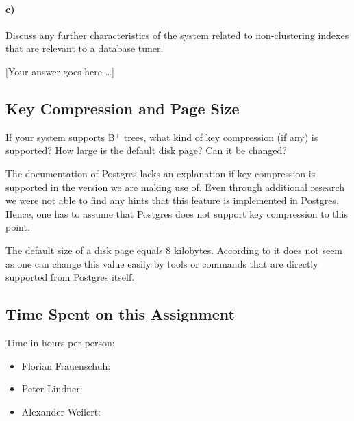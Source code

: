 \documentclass[11pt]{scrartcl}
\newcommand{\youranswerhere}{[Your answer goes here \ldots]}
\begin{document}
\paragraph{c)}

Discuss any further characteristics of the system related to non-clustering indexes that are relevant to a database tuner.

\youranswerhere{}

\subsection{Key Compression and Page Size}

If your system supports B$^+$ trees, what kind of key compression (if any) is supported?
How large is the default disk page?
Can it be changed?

The documentation of Postgres lacks an explanation if key compression is supported in the version we are making use of.
Even through additional research we were not able to find any hints that this feature is implemented in Postgres.
Hence, one has to assume that Postgres does not support key compression to this point.

The default size of a disk page equals 8 kilobytes.
According to \cite{PostgreSQL2024DiskUsage} it does not seem as one can change this value easily by tools or commands
that are directly supported from Postgres itself.

\subsection*{Time Spent on this Assignment}

Time in hours per person:
\begin{itemize}
  \item Florian Frauenschuh: \textbf{}
  \item Peter Lindner: \textbf{}
  \item Alexander Weilert: \textbf{}
\end{itemize}

\pagebreak

\printbibliography[title=References]
\end{document}
